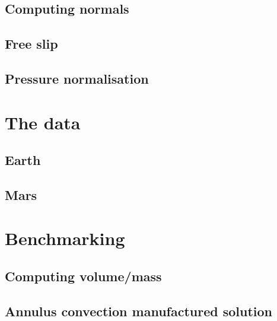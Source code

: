 \documentclass[a4paper]{article}
\begin{document}
\subsection{Computing normals}

\subsection{Free slip}

\subsection{Pressure normalisation}





\section{The data}

\subsection{Earth}


\subsection{Mars}


\section{Benchmarking}

\subsection{Computing volume/mass}


\subsection{Annulus convection manufactured solution}
\end{document}
